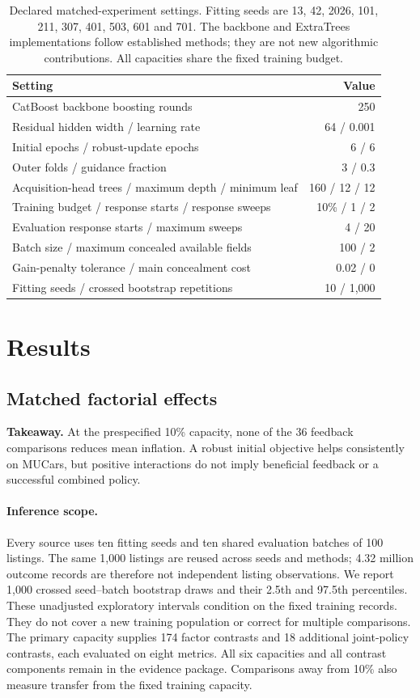 \documentclass[11pt]{article}
\begin{document}
\begin{table}[htbp]\centering\small
\begin{tabular}{lr}\toprule
Setting & Value\\\midrule
CatBoost backbone boosting rounds ~\cite{catboost} & 250\\
Residual hidden width / learning rate & 64 / 0.001\\
Initial epochs / robust-update epochs & 6 / 6\\
Outer folds / guidance fraction & 3 / 0.3\\
Acquisition-head trees / maximum depth / minimum leaf & 160 / 12 / 12\\
Training budget / response starts / response sweeps & 10\% / 1 / 2\\
Evaluation response starts / maximum sweeps & 4 / 20\\
Batch size / maximum concealed available fields & 100 / 2\\
Gain-penalty tolerance / main concealment cost & 0.02 / 0\\
Fitting seeds / crossed bootstrap repetitions & 10 / 1,000\\\bottomrule
\end{tabular}
\caption{Declared matched-experiment settings. Fitting seeds are
13, 42, 2026, 101, 211, 307, 401, 503, 601 and 701. The backbone and
ExtraTrees implementations follow established methods; they are not new
algorithmic contributions. All capacities share the fixed training budget.}
\label{tab:settings}\end{table}

\section{Results}\label{sec:results}
\subsection{Matched factorial effects}\label{sec:factorial_results}
\noindent\textbf{Takeaway.} At the prespecified 10\% capacity, none of the
36 feedback comparisons reduces mean inflation. A robust initial objective
helps consistently on MUCars, but positive interactions do not imply beneficial
feedback or a successful combined policy.

\paragraph{Inference scope.}
Every source uses ten fitting seeds and ten shared evaluation batches of
100 listings. The same 1,000 listings are reused across seeds and methods;
4.32 million outcome records are therefore not independent listing observations.
We report 1,000 crossed seed--batch bootstrap draws and their 2.5th and 97.5th
percentiles. These unadjusted exploratory intervals condition on the fixed
training records. They do not cover a new training population or correct for
multiple comparisons. The primary capacity supplies 174 factor contrasts and
18 additional joint-policy contrasts, each evaluated on eight metrics.
All six capacities and all contrast components remain in the evidence package.
Comparisons away from 10\% also measure transfer from the fixed training capacity.
\end{document}
